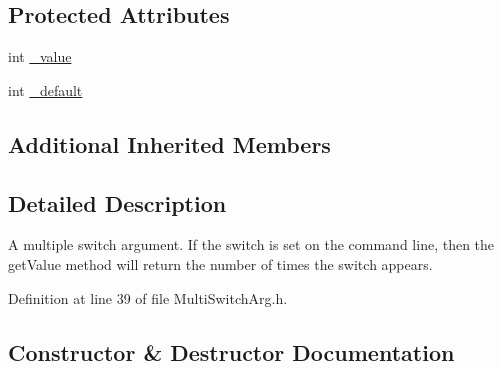 \subsection*{Protected Attributes}
\begin{DoxyCompactItemize}
\item 
int \hyperlink{class_t_c_l_a_p_1_1_multi_switch_arg_ab488d4bcdde96fc9edea87ee9b6f5839}{\+\_\+value}
\item 
int \hyperlink{class_t_c_l_a_p_1_1_multi_switch_arg_afcd5b3e418e455af3d31aec1e300bb74}{\+\_\+default}
\end{DoxyCompactItemize}
\subsection*{Additional Inherited Members}


\subsection{Detailed Description}
A multiple switch argument. If the switch is set on the command line, then the get\+Value method will return the number of times the switch appears. 

Definition at line 39 of file Multi\+Switch\+Arg.\+h.



\subsection{Constructor \& Destructor Documentation}
\hypertarget{class_t_c_l_a_p_1_1_multi_switch_arg_a37db9658517f206fd69936e1458d59b0}{}
